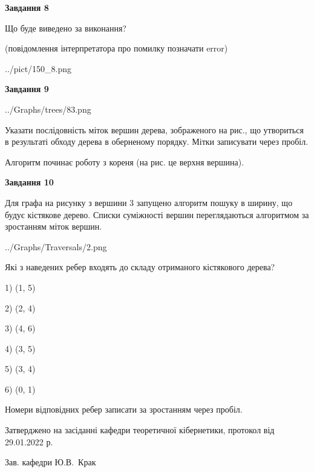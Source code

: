 \documentclass[12pt, ukrainian]{article}
\begin{document}
{\begin {large}
{\begin {center}\textbf{Завдання 8}\end {center}}\par
Що буде виведено за виконання?\par
 (повідомлення інтерпретатора про помилку позначати error)\par
\begin{center}
	{../pict/150_8.png}
\end{center}
\newpage

{\begin {center}\textbf{Завдання 9}\end {center}}\par

\begin{center}
	{../Graphs/trees/83.png}
\end{center}
Указати послідовність міток вершин дерева, зображеного на рис., що утвориться в результаті обходу дерева в оберненому порядку. Мітки записувати через пробіл.\par Алгоритм починає роботу з кореня (на рис. це верхня вершина).\par
\newpage

{\begin {center}\textbf{Завдання 10}\end {center}}\par
Для графа на рисунку з вершини 3 запущено алгоритм пошуку в ширину, що будує кістякове дерево. Списки суміжності вершин переглядаються алгоритмом за зростанням міток вершин.\par
\begin{center}
	{../Graphs/Traversals/2.png}
\end{center}
\par Які з наведених ребер входять до складу отриманого кістякового дерева?\par
1) (1, 5)\par
2) (2, 4)\par
3) (4, 6)\par
4) (3, 5)\par
5) (3, 4)\par
6) (0, 1)\par
{\vskip 15pt} Номери відповідних ребер записати за зростанням через пробіл.\par
\newpage


\end {large}
}
{\smallskip \begin {small} Затверджено на засіданні кафедри теоретичної кібернетики, протокол  від   29.01.2022 р.\par\smallskip\smallskip
{\parbox {6.5 cm}{Зав. кафедри \dotfill Ю.В.~Крак}} \end{small}}
\end{document}

